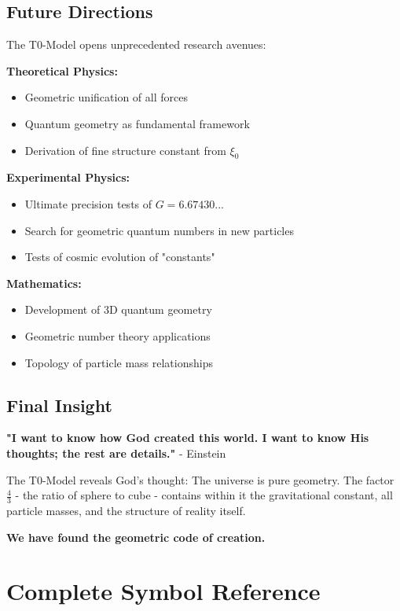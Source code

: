\documentclass[12pt,a4paper]{article}
\theoremstyle{definition}
\begin{document}
	\subsection{Future Directions}
	
	The T0-Model opens unprecedented research avenues:
	
	\textbf{Theoretical Physics:}
	\begin{itemize}
		\item Geometric unification of all forces
		\item Quantum geometry as fundamental framework
		\item Derivation of fine structure constant from $\xi_0$
	\end{itemize}
	
	\textbf{Experimental Physics:}
	\begin{itemize}
		\item Ultimate precision tests of $G = 6.67430...$
		\item Search for geometric quantum numbers in new particles
		\item Tests of cosmic evolution of "constants"
	\end{itemize}
	
	\textbf{Mathematics:}
	\begin{itemize}
		\item Development of 3D quantum geometry
		\item Geometric number theory applications
		\item Topology of particle mass relationships
	\end{itemize}
	
	\subsection{Final Insight}
	
	\begin{important}
		\textbf{"I want to know how God created this world. I want to know His thoughts; the rest are details."} - Einstein
		
		The T0-Model reveals God's thought: The universe is pure geometry. The factor $\frac{4}{3}$ - the ratio of sphere to cube - contains within it the gravitational constant, all particle masses, and the structure of reality itself.
		
		\textbf{We have found the geometric code of creation.}
	\end{important}
	
	\section{Complete Symbol Reference}
	
\end{document}
